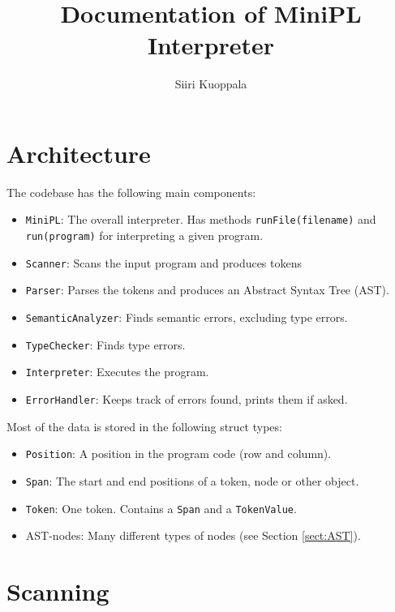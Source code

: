 \documentclass[a4paper]{article}
\newcommand*{\code}[1]{\texttt{#1}}
\begin{document}
\begin{titlepage}
  \title{Documentation of MiniPL Interpreter}
  \author{Siiri Kuoppala}
  \maketitle
  \tableofcontents
\end{titlepage}

\section{Architecture}

The codebase has the following main components:

\begin{itemize}
  \item \code{MiniPL}: The overall interpreter. Has methods 
        \code{runFile(filename)} and \code{run(program)} for 
        interpreting a given program.
  \item \code{Scanner}:  
        Scans the input program and produces tokens
  \item \code{Parser}:
        Parses the tokens and produces an Abstract Syntax Tree (AST).
  \item \code{SemanticAnalyzer}: Finds semantic
        errors, excluding type errors.
  \item \code{TypeChecker}: Finds type errors.
  \item \code{Interpreter}: Executes the program.
  \item \code{ErrorHandler}: Keeps track of errors found, prints them if asked.
\end{itemize}

Most of the data is stored in the following struct types:
\begin{itemize}
  \item \code{Position}: A position in the program code (row and column).
  \item \code{Span}: The start and end positions of a token, node or other object.
  \item \code{Token}: One token. Contains a \code{Span} and 
  a \code{TokenValue}.
  \item AST-nodes: Many different types of nodes 
        (see Section \ref{sect:AST}).
\end{itemize}

\clearpage
\section{Scanning}
\end{document}

